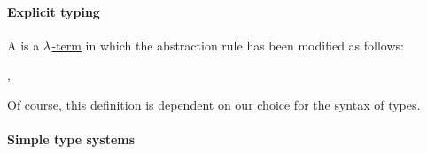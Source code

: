 \paragraph{Explicit typing}

\begin{definition}\label{def:pseudoterm}
  A  is a \hyperref[def:lambda_term]{\( \synlambda \)-term} in which the abstraction rule has been modified as follows:
  \begin{bnf*}
     {\bnftsq{\( ( \)} \bnfsp \bnftsq{\( \synlambda \)} \bnfsp {} \bnfsp \bnftsq{:} \bnfsp {} \bnfsp {} \bnfsp {} \bnfsp \bnftsq{\( ) \)}}, \\
  \end{bnf*}
\end{definition}
\begin{comments}
  \item Of course, this definition is dependent on our choice for the syntax of types.
\end{comments}

\paragraph{Simple type systems}\hfill

\begin{remark}\label{rem:church_and_curry_typing}

\end{remark}

\begin{remark}\label{rem:dependent_types}
\end{remark}

